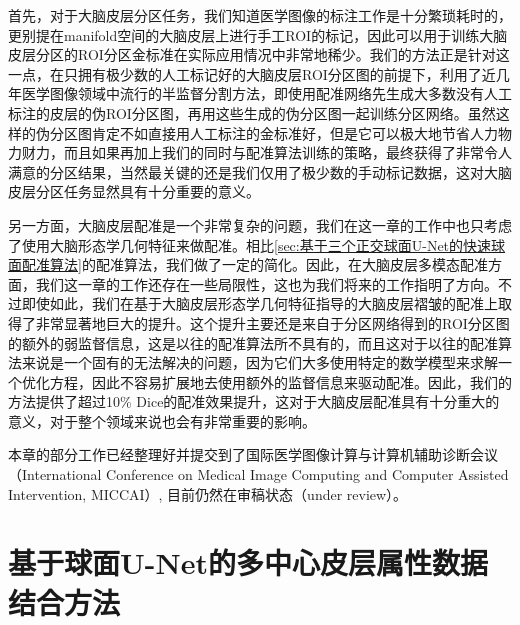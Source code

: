 首先，对于大脑皮层分区任务，我们知道医学图像的标注工作是十分繁琐耗时的，更别提在manifold空间的大脑皮层上进行手工ROI的标记，因此可以用于训练大脑皮层分区的ROI分区金标准在实际应用情况中非常地稀少。我们的方法正是针对这一点，在只拥有极少数的人工标记好的大脑皮层ROI分区图的前提下，利用了近几年医学图像领域中流行的半监督分割方法，即使用配准网络先生成大多数没有人工标注的皮层的伪ROI分区图，再用这些生成的伪分区图一起训练分区网络。虽然这样的伪分区图肯定不如直接用人工标注的金标准好，但是它可以极大地节省人力物力财力，而且如果再加上我们的同时与配准算法训练的策略，最终获得了非常令人满意的分区结果，当然最关键的还是我们仅用了极少数的手动标记数据，这对大脑皮层分区任务显然具有十分重要的意义。

另一方面，大脑皮层配准是一个非常复杂的问题，我们在这一章的工作中也只考虑了使用大脑形态学几何特征来做配准。相比\ref{sec:基于三个正交球面U-Net的快速球面配准算法}的配准算法，我们做了一定的简化。因此，在大脑皮层多模态配准方面，我们这一章的工作还存在一些局限性，这也为我们将来的工作指明了方向。不过即使如此，我们在基于大脑皮层形态学几何特征指导的大脑皮层褶皱的配准上取得了非常显著地巨大的提升。这个提升主要还是来自于分区网络得到的ROI分区图的额外的弱监督信息，这是以往的配准算法所不具有的，而且这对于以往的配准算法来说是一个固有的无法解决的问题，因为它们大多使用特定的数学模型来求解一个优化方程，因此不容易扩展地去使用额外的监督信息来驱动配准。因此，我们的方法提供了超过10\% Dice的配准效果提升，这对于大脑皮层配准具有十分重大的意义，对于整个领域来说也会有非常重要的影响。

本章的部分工作已经整理好并提交到了国际医学图像计算与计算机辅助诊断会议（International Conference on Medical Image Computing and Computer Assisted Intervention, MICCAI）, 目前仍然在审稿状态（under review）。







\chapter{基于球面U-Net的多中心皮层属性数据结合方法}\label{sec:基于球面U-Net的多中心皮层属性数据结合方法}


